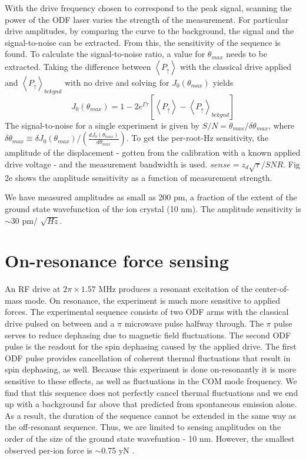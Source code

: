 \documentclass[aps,prl,twocolumn,groupedaddress]{revtex4-1}
\begin{document}
With the drive frequency chosen to correspond to the peak signal, scanning the power of the ODF laser varies the strength of the measurement. For particular drive amplitudes, by comparing the curve to the background, the signal and the signal-to-noise can be extracted. From this, the sensitivity of the sequence is found. To calculate the signal-to-noise ratio, a value for $\theta_{max}$ needs to be extracted. Taking the difference between $\left< P_{\uparrow} \right>$ with the classical drive applied and $\left< P_{\uparrow} \right>_{bckgnd}$ with no drive and solving for $J_0(\theta_{max})$ yields
\[J_0(\theta_{max}) = 1 - 2e^{\Gamma \tau} \left[ \left< P_{\uparrow} \right> - \left< P_{\uparrow} \right>_{bckgnd} \right] \]
The signal-to-noise for a single experiment is given by $S/N =\theta_{max}/\delta \theta_{max}$, where $\delta \theta_{max} \equiv \delta J_0(\theta_{max})/ \left( \frac{dJ_0(\theta_{max})}{d\theta_{max}} \right)$. To get the per-root-Hz sensitivity, the amplitude of the displacement - gotten from the calibration with a known applied drive voltage - and the measurement bandwidth is used. $sense = z_d\sqrt{\tau}/SNR$. Fig 2e shows the amplitude sensitivity as a function of measurement strength.

We have measured amplitudes as small as 200 pm, a fraction of the extent of the ground state wavefunction of the ion crystal (10 nm). The amplitude sensitivity is $\sim$30 pm/ $ \sqrt{Hz}$.

\section{On-resonance force sensing}

An RF drive at $2\pi \times 1.57$ MHz produces a resonant excitation of the center-of-mass mode. On resonance, the experiment is much more sensitive to applied forces. The experimental sequence consists of two ODF arms with the classical drive pulsed on between and a $\pi$ microwave pulse halfway through. The $\pi$ pulse serves to reduce dephasing due to magnetic field fluctuations. The second ODF pulse is the readout for the spin dephasing caused by the applied drive. The first ODF pulse provides cancellation of coherent thermal fluctuations that result in spin dephasing, as well. Because this experiment is done on-resonantly it is more sensitive to these effects, as well as fluctuations in the COM mode frequency. We find that this sequence does not perfectly cancel thermal fluctuations and we end up with a background far above that predicted from spontaneous emission alone. As a result, the duration of the sequence cannot be extended in the same way as the off-resonant sequence. Thus, we are limited to sensing amplitudes on the order of the size of the ground state wavefuntion - 10 nm. However, the smallest observed per-ion force is $\sim$0.75 yN \citep{Biercuk2010a}. 
\end{document}
